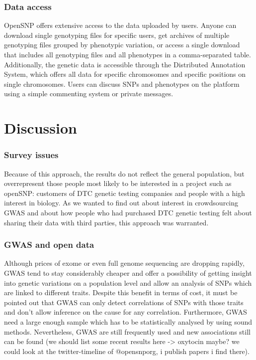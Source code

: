 \documentclass[10pt]{article}
\begin{document}
\subsubsection*{Data access}
OpenSNP offers extensive access to the data uploaded by users. Anyone can download single genotyping files for specific users, get archives of multiple genotyping files grouped by phenotypic variation, or access a single download that includes all genotyping files and all phenotypes in a comma-separated table. Additionally, the genetic data is accessible through the Distributed Annotation System, which offers all data for specific chromosomes and specific positions on single chromosomes. Users can discuss SNPs and phenotypes on the platform using a simple commenting system or private messages. 


\section*{Discussion}

\subsubsection*{Survey issues}
Because of this approach, the results do not reflect the general population, but overrepresent those people most likely to be interested in a project such as openSNP: customers of DTC genetic testing companies and people with a high interest in biology. As we wanted to find out about interest in crowdsourcing GWAS and about how people who had purchased DTC genetic testing felt about sharing their data with third parties, this approach was warranted.
\subsubsection*{GWAS and open data}
Although prices of exome or even full genome sequencing are dropping rapidly, GWAS tend to stay considerably cheaper and offer a possibility of getting insight into genetic variations on a population level and allow an analysis of SNPs which are linked to different traits. Despite this benefit in terms of cost, it must be pointed out that GWAS can only detect correlations of SNPs with those traits and don't allow inference on the cause for any correlation. Furthermore, GWAS need a large enough sample which has to be statistically analysed by using sound methods. Nevertheless, GWAS are still frequently used and new associations still can be found (we should list some recent results here -> oxytocin maybe? we could look at the twitter-timeline of @opensnporg, i publish papers i find there).
\end{document}
